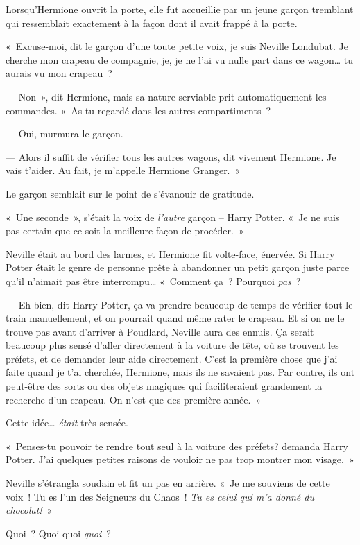 Lorsqu'Hermione ouvrit la porte, elle fut accueillie par un jeune garçon tremblant qui ressemblait exactement à la façon dont il avait frappé à la porte.

«~Excuse-moi, dit le garçon d'une toute petite voix, je suis Neville Londubat. Je cherche mon crapeau de compagnie, je, je ne l'ai vu nulle part dans ce wagon… tu aurais vu mon crapeau~?

--- Non~», dit Hermione, mais sa nature serviable prit automatiquement les commandes.
«~As-tu regardé dans les autres compartiments~?

--- Oui, murmura le garçon.

--- Alors il suffit de vérifier tous les autres wagons, dit vivement Hermione.
Je vais t'aider.
Au fait, je m'appelle Hermione Granger.~»

Le garçon semblait sur le point de s'évanouir de gratitude.

«~Une seconde~», s'était la voix de \emph{l'autre} garçon -- Harry Potter.
«~Je ne suis pas certain que ce soit la meilleure façon de procéder.~»

Neville était au bord des larmes, et Hermione fit volte-face, énervée.
Si Harry Potter était le genre de personne prête à abandonner un petit garçon juste parce qu'il n'aimait pas être interrompu…
«~Comment ça~? Pourquoi \emph{pas}~?

--- Eh bien, dit Harry Potter, ça va prendre beaucoup de temps de vérifier tout le train manuellement, et on pourrait quand même rater le crapeau.
Et si on ne le trouve pas avant d'arriver à Poudlard, Neville aura des ennuis.
Ça serait beaucoup plus sensé d'aller directement à la voiture de tête, où se trouvent les préfets, et de demander leur aide directement.
C'est la première chose que j'ai faite quand je t'ai cherchée, Hermione, mais ils ne savaient pas.
Par contre, ils ont peut-être des sorts ou des objets magiques qui faciliteraient grandement la recherche d'un crapeau.
On n'est que des première année.~»

Cette idée… \emph{était} très sensée.

«~Penses-tu pouvoir te rendre tout seul à la voiture des préfets?  demanda Harry Potter.
J'ai quelques petites raisons de vouloir ne pas trop montrer mon visage.~»

Neville s'étrangla soudain et fit un pas en arrière.
«~Je me souviens de cette voix~!
Tu es l'un des Seigneurs du Chaos~!
\emph{Tu es celui qui m'a donné du chocolat!}~»

Quoi~? Quoi quoi \emph{quoi}~?

